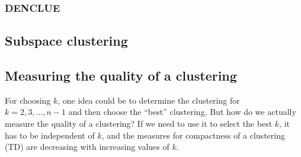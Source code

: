     \subsubsection{DENCLUE}
    
    
    \subsection{Subspace clustering}
    
    \subsection{Measuring the quality of a clustering}
    For choosing $k$, one idea could be to determine the clustering for 
    $k=2,3,\dots,n-1$ and then choose the ``best'' clustering. But how do we 
    actually measure the quality of a clustering? If we need to use it to 
    select the best $k$, it has to be independent of $k$, and the measures for 
    compactness of a clustering (TD) are decreasing with increasing values of 
    $k$.
    
